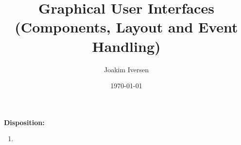 \documentclass{article}
\title{Graphical User Interfaces (Components, Layout and Event Handling)}
\author{Joakim Iversen}
\date{\today}
\begin{document}
\maketitle
\newpage

\textbf{\Large Disposition:}
\begin{enumerate}
    \item 
\end{enumerate}
\end{document}
